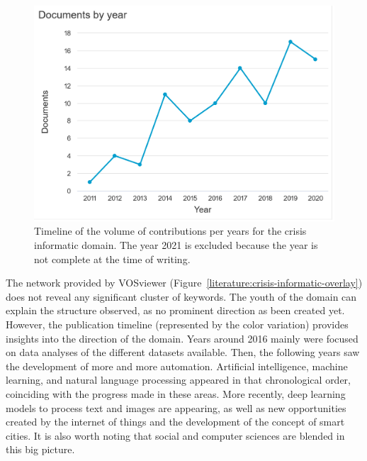 \begin{figure}[thb]
    \includegraphics[width=\textwidth]{figures/chap-2/crisis-informatic-hist.pdf}
    \caption{Timeline of the volume of contributions per years for the crisis informatic domain. The year 2021 is excluded because the year is not complete at the time of writing.}
    \label{literature:crisis-informatic-hist}
\end{figure}

The network provided by VOSviewer (Figure~\ref{literature:crisis-informatic-overlay}) does not reveal any significant cluster of keywords.
The youth of the domain can explain the structure observed, as no prominent direction as been created yet.
However, the publication timeline (represented by the color variation) provides insights into the direction of the domain.
Years around 2016 mainly were focused on data analyses of the different datasets available.
Then, the following years saw the development of more and more automation.
Artificial intelligence, machine learning, and natural language processing appeared in that chronological order, coinciding with the progress made in these areas.
More recently, deep learning models to process text and images are appearing, as well as new opportunities created by the internet of things and the development of the concept of smart cities.
It is also worth noting that social and computer sciences are blended in this big picture.

